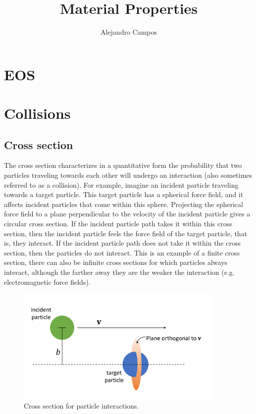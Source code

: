 \documentclass[a4paper,11pt]{report}
\title{Material Properties}
\author{Alejandro Campos}
\begin{document}
\maketitle
\tableofcontents

\chapter{EOS}

\chapter{Collisions}
\section{Cross section}
The cross section characterizes in a quantitative form the probability that two particles traveling towards each other will undergo an interaction (also sometimes referred to as a collision). For example, imagine an incident particle traveling towards a target particle. This target particle has a spherical force field, and it affects incident particles that come within this sphere. Projecting the spherical force field to a plane perpendicular to the velocity of the incident particle gives a circular cross section. If the incident particle path takes it within this cross section, then the incident particle feels the force field of the target particle, that is, they interact. If the incident particle path does not take it within the cross section, then the particles do not interact. This is an example of a finite cross section, there can also be infinite cross sections for which particles always interact, although the farther away they are the weaker the interaction (e.g. electromagnetic force fields).

\begin{figure}[ht]
\centering
\includegraphics[width=10cm]{../../images/cross_section.pdf}
\caption{Cross section for particle interactions.}
\label{fig:cross_section}
\end{figure}
\end{document}

